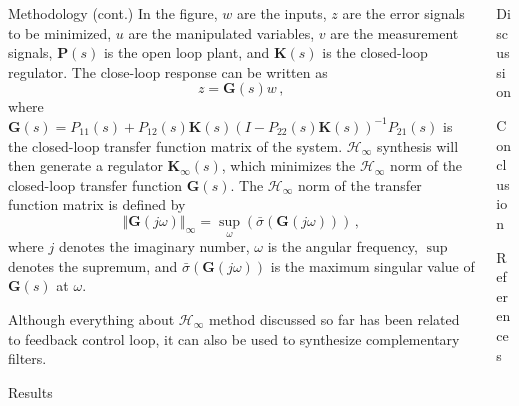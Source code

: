 \documentclass{beamer}
\begin{document}
\begin{frame}[t]
\begin{columns}[t]
\begin{column}{0.32\linewidth}
\begin{block}{Methodology (cont.)}
			In the figure, $w$ are the inputs, $z$ are the error signals to be minimized, $u$ are the manipulated variables, $v$ are the measurement signals, $\mathbf{P}(s)$ is the open loop plant, and $\mathbf{K}(s)$ is the closed-loop regulator.
			The close-loop response can be written as
			\begin{equation}
				z=\mathbf{G}(s)w\,,
			\end{equation}
			where $\mathbf{G}(s) = P_{11}(s) + P_{12}(s)\mathbf{K}(s)\left(I-P_{22}(s)\mathbf{K}(s)\right)^{-1}P_{21}(s)$ is the closed-loop transfer function matrix of the system.
			$\mathcal{H}_\infty$ synthesis will then generate a regulator $\mathbf{K}_\infty(s)$, which minimizes the $\mathcal{H}_\infty$ norm of the closed-loop transfer function $\mathbf{G}(s)$.
			The $\mathcal{H}_\infty$ norm of the transfer function matrix is defined by
			\begin{equation}
				\left\Vert\mathbf{G}(j\omega)\right\Vert_\infty = \sup_\omega\left(\bar\sigma(\mathbf{G}(j\omega))\right)\,,
			\end{equation}
			where $j$ denotes the imaginary number, $\omega$ is the angular frequency, $\sup$ denotes the supremum, and $\bar\sigma(\mathbf{G}(j\omega))$ is the maximum singular value of $\mathbf{G}(s)$ at $\omega$.
			
			\medskip
			
			Although everything about $\mathcal{H}_\infty$ method discussed so far has been related to feedback control loop, it can also be used to synthesize complementary filters.
				
				
				
			\end{block}
			
			\begin{block}{Results}
			\end{block}
		\end{column}
	
		\begin{column}{0.32\linewidth}
			\begin{block}{Discussion}
				\lipsum[5]
			\end{block}
			\begin{block}{Conclusion}
				\lipsum[6]
			\end{block}
			\begin{block}{References}
				
				
			\end{block}
		\end{column}
	\end{columns}
\end{frame}
\end{document}
